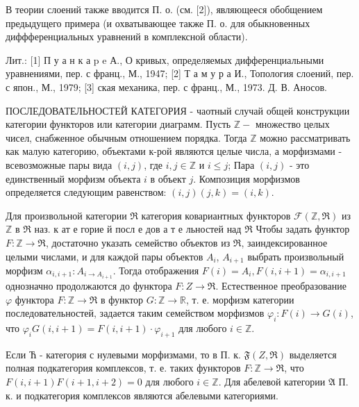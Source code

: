 \documentclass[10pt]{article}
\begin{document}
В теории слоений также вводится П. о. (см. [2]), являющееся обобщением предыдущего примера (и охватывающее также П. о. для обыкновенных диффференциальных уравнений в комплексной области).



Лит.: [1] П у а н к а p e А., О кривых, определяемых дифференциальными уравнениями, пер. с франц., М., 1947; [2] Т а м у р а И., Топология слоений, пер. с япон., М., 1979; [3] ская механика, пер. с франц., М., 1973. Д. В. Аносов.



ПОСЛЕДОВАТЕЛЬНОСТЕЙ КАТЕГОРИЯ - чаотный случай общей конструкции категории функторов или категории диаграмм. Пусть $\mathbb{Z}-$ множество целых чисел, снабженное обычным отношением порядка. Тогда $\mathbb{Z}$ можно рассматривать как малую категорию, объектами к-рой являются целые числа, а морфизмами - всевозможные пары вида $(i, j)$, где $i, j \in \mathbb{Z}$ и $i \leqslant j$; Пара $(i, j)$ - это единственный морфизм объекта $i$ в объект $j$. Композиция морфизмов определяется следующим равенством: $(i, j)(j, k)=(i, k)$.



Для произвольной категории $\Re$ категория ковариантных функторов $\mathscr{F}(\mathbb{Z}, \mathscr{\Re})$ из $\mathbb{Z}$ в $\mathscr{\Re}$ наз. к ат е горие й посл е дов а т е льностей над $\mathfrak{R}$ Чтобы задать функтор $F: \mathbb{Z} \rightarrow \Re$, достаточно указать семейство объектов из $\mathfrak{R}$, заиндексированное целыми числами, и для каждой пары объектов $A_{i}$, $A_{i+1}$ выбрать произвольный морфизм $\alpha_{i, i+1}: A_{i \rightarrow A_{i+1}}$. Тогда отображения $F(i)=A_{i}, F(i, i+1)=\alpha_{i, i+1}$ однозначно продолжаются до функтора $F: Z \rightarrow \mathfrak{R}$. Естественное преобразование $\varphi$ функтора $F: \mathbb{Z} \rightarrow \mathscr{\Re}$ в функтор $G: \mathbb{Z} \rightarrow \mathbb{R}$, т. е. морфизм категории последовательностей, задается таким семейством морфизмов $\varphi_{i}: F(i) \rightarrow G(i)$, что $\varphi_{i} G(i, i+1)=F(i, i+1) \cdot \varphi_{i+1}$ для любого $i \in \mathbb{Z}$.



Если Ћ - категория с нулевыми морфизмами, то в П. к. $\mathfrak{F}(Z, \mathfrak{R})$ выделяется полная подкатегория комплексов, т. е. таких функторов $F: \mathbb{Z} \rightarrow \Re$, что $F(i, i+1) F(i+1, i+2)=0$ для любого $i \in \mathbb{Z}$. Для абелевой категории $\mathfrak{A}$ П. к. и подкатегория комплексов являются абелевыми категориями.
\end{document}
